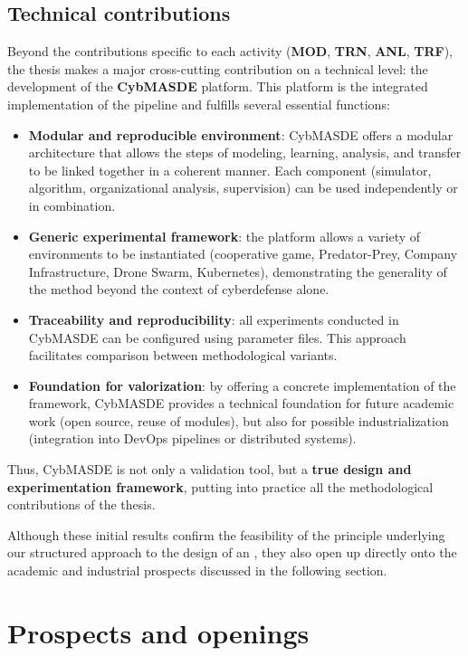 \subsection* {Technical contributions}
Beyond the contributions specific to each activity (\textbf{MOD}, \textbf{TRN}, \textbf{ANL}, \textbf{TRF}), the thesis makes a major cross-cutting contribution on a technical level: the development of the \textbf {CybMASDE} platform.
This platform is the integrated implementation of the  pipeline and fulfills several essential functions:
\begin{itemize}

  \item \textbf{Modular and reproducible environment}: CybMASDE offers a modular architecture that allows the steps of modeling, learning, analysis, and transfer to be linked together in a coherent manner. Each component (simulator,  algorithm, organizational analysis, supervision) can be used independently or in combination.
  \item \textbf {Generic experimental framework}: the platform allows a variety of environments to be instantiated (cooperative game, Predator-Prey, Company Infrastructure, Drone Swarm, Kubernetes), demonstrating the generality of the method beyond the context of cyberdefense alone.
  \item \textbf{Traceability and reproducibility}: all experiments conducted in CybMASDE can be configured using parameter files. This approach facilitates comparison between methodological variants.
  \item \textbf{Foundation for valorization}: by offering a concrete implementation of the  framework, CybMASDE provides a technical foundation for future academic work (open source, reuse of modules), but also for possible industrialization (integration into DevOps pipelines or distributed systems).
\end{itemize}
Thus, CybMASDE is not only a validation tool, but a \textbf{true design and experimentation framework}, putting into practice all the methodological contributions of the thesis.

\noindent
Although these initial results confirm the feasibility of the principle underlying our structured approach to the design of an , they also open up directly onto the academic and industrial prospects discussed in the following section.
\section*{Prospects and openings}
\label {sec:perspectives}
